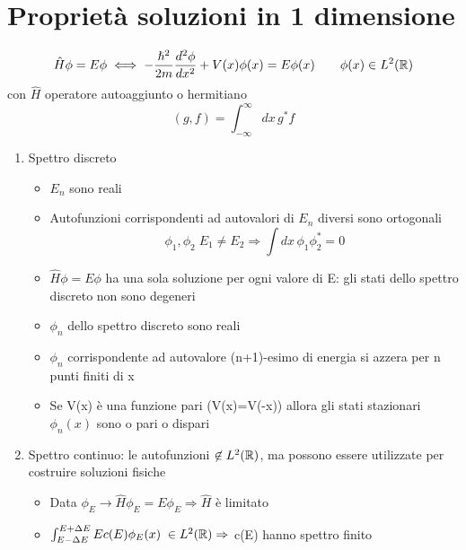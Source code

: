 \chapter{Proprietà soluzioni in 1 dimensione}

\begin{equation*}
    \hat{H}\phi = E\phi \iff -\frac{\hslash^2}{2m}\frac{d^2\phi}{dx^2} + V(x)\phi(x) = E \phi(x) \qquad \phi(x) \in L^2(\mathbb{R})
\end{equation*}
con $\hat{H}$ operatore autoaggiunto o hermitiano
\begin{equation*}
    (g,f) = \int_{-\infty}^\infty dx \, g^*f
\end{equation*}
\begin{enumerate}
    \item Spettro discreto
    \begin{itemize}
        \item $E_n$ sono reali
        \item Autofunzioni corrispondenti ad autovalori di $E_n$ diversi sono ortogonali
        \begin{equation*}
            \phi_1,\phi_2 \; E_1 \neq E_2 \Rightarrow \int dx \, \phi_1\phi_2^* = 0
        \end{equation*}
        \item $\hat{H}\phi = E\phi$ ha una sola soluzione per ogni valore di E: gli stati dello spettro discreto non sono degeneri
        \item $\phi_n$ dello spettro discreto sono reali
        \item $\phi_n$ corrispondente ad autovalore (n+1)-esimo di energia si azzera per n punti finiti di x
        \item Se V(x) è una funzione pari (V(x)=V(-x)) allora gli stati stazionari $\phi_n(x)$ sono o pari o dispari   
    \end{itemize}
    \item Spettro continuo: le autofunzioni $\not\in L^2(\mathbb{R})$, ma possono essere utilizzate per costruire soluzioni fisiche 
    \begin{itemize}
        \item Data $\phi_E \rightarrow \hat{H}\phi_E = E\phi_E \Rightarrow \hat{H}$ è limitato
        \item $\int_{E-\Delta E}^{E+ \Delta E} E c(E)\phi_E(x) \; \in L^2(\mathbb{R}) \Rightarrow$ c(E) hanno spettro finito 
    \end{itemize}
\end{enumerate}

